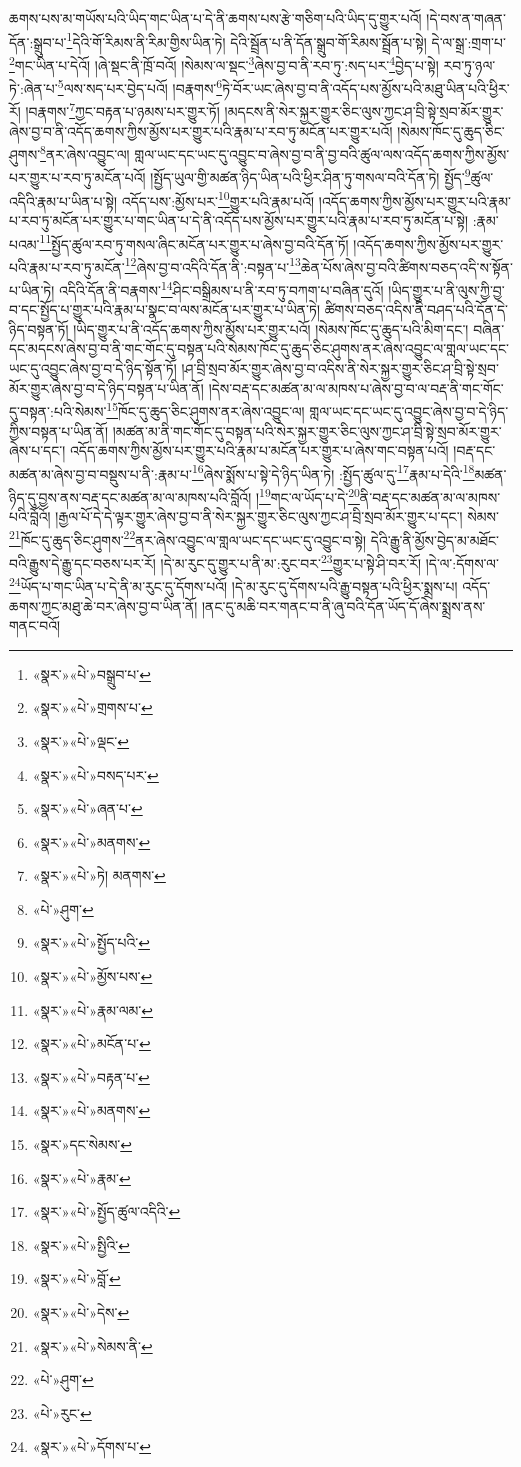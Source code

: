ཆགས་པས་མ་གཡོས་པའི་ཡིད་གང་ཡིན་པ་དེ་ནི་ཆགས་པས་རྩེ་གཅིག་པའི་ཡིད་དུ་གྱུར་པའོ། །དེ་བས་ན་གཞན་དོན་:སྒྲུབ་པ་\footnote{«སྣར་»«པེ་»བསྒྲུབ་པ་}དེའི་གོ་རིམས་ནི་རིམ་གྱིས་ཡིན་ཏེ། དེའི་སྦྲོན་པ་ནི་དོན་སྒྲུབ་གོ་རིམས་སྦྲོན་པ་སྟེ། དེ་ལ་སྒྲ་:གྲག་པ་\footnote{«སྣར་»«པེ་»གྲགས་པ་}གང་ཡིན་པ་དེའོ། །ཞེ་སྡང་ནི་ཁྲོ་བའོ། །སེམས་ལ་སྡང་\footnote{«སྣར་»«པེ་»ལྡང་}ཞེས་བྱ་བ་ནི་རབ་ཏུ་:སད་པར་\footnote{«སྣར་»«པེ་»བསད་པར་}བྱེད་པ་སྟེ། རབ་ཏུ་ཉལ་ཏེ་:ཞེན་པ་\footnote{«སྣར་»«པེ་»ཞན་པ་}ལས་སད་པར་བྱེད་པའོ། །བརྣགས་\footnote{«སྣར་»«པེ་»མནགས་}ཏེ་བོར་ཡང་ཞེས་བྱ་བ་ནི་འདོད་པས་མྱོས་པའི་མཐུ་ཡིན་པའི་ཕྱིར་རོ། །བརྣགས་\footnote{«སྣར་»«པེ་»ཏེ། མནགས་}ཀྱང་བརྟན་པ་ཉམས་པར་གྱུར་ཏོ། །མདངས་ནི་སེར་སྐྱར་གྱུར་ཅིང་ལུས་ཀྱང་ཤ་བྲི་སྟེ་སྲབ་མོར་གྱུར་ཞེས་བྱ་བ་ནི་འདོད་ཆགས་ཀྱིས་མྱོས་པར་གྱུར་པའི་རྣམ་པ་རབ་ཏུ་མངོན་པར་གྱུར་པའོ། །སེམས་ཁོང་དུ་ཆུད་ཅིང་ཤུགས་\footnote{«པེ་»ཤུག་}ནར་ཞེས་འབྱུང་ལ། གླལ་ཡང་དང་ཡང་དུ་འབྱུང་བ་ཞེས་བྱ་བ་ནི་བྱ་བའི་ཚུལ་ལས་འདོད་ཆགས་ཀྱིས་མྱོས་པར་གྱུར་པ་རབ་ཏུ་མངོན་པའོ། །སྤྱོད་ཡུལ་གྱི་མཚན་ཉིད་ཡིན་པའི་ཕྱིར་ཤིན་ཏུ་གསལ་བའི་དོན་ཏེ། སྤྱོད་\footnote{«སྣར་»«པེ་»སྤྱོད་པའི་}ཚུལ་འདིའི་རྣམ་པ་ཡིན་པ་སྟེ། འདོད་པས་:མྱོས་པར་\footnote{«སྣར་»«པེ་»མྱོས་པས་}གྱུར་པའི་རྣམ་པའོ། །འདོད་ཆགས་ཀྱིས་མྱོས་པར་གྱུར་པའི་རྣམ་པ་རབ་ཏུ་མངོན་པར་གྱུར་པ་གང་ཡིན་པ་དེ་ནི་འདོད་པས་མྱོས་པར་གྱུར་པའི་རྣམ་པ་རབ་ཏུ་མངོན་པ་སྟེ། :རྣམ་པའམ་\footnote{«སྣར་»«པེ་»རྣམ་ལམ་}སྤྱོད་ཚུལ་རབ་ཏུ་གསལ་ཞིང་མངོན་པར་གྱུར་པ་ཞེས་བྱ་བའི་དོན་ཏོ། །འདོད་ཆགས་ཀྱིས་མྱོས་པར་གྱུར་པའི་རྣམ་པ་རབ་ཏུ་མངོན་\footnote{«སྣར་»«པེ་»མངོན་པ་}ཞེས་བྱ་བ་འདིའི་དོན་ནི་:བསྟན་པ་\footnote{«སྣར་»«པེ་»བརྟན་པ་}ཆེན་པོས་ཞེས་བྱ་བའི་ཚིགས་བཅད་འདི་ས་སྟོན་པ་ཡིན་ཏེ། འདིའི་དོན་ནི་བརྣགས་\footnote{«སྣར་»«པེ་»མནགས་}ཤིང་བསྒྲིམས་པ་ནི་རབ་ཏུ་བཀག་པ་བཞིན་དུའོ། །ཡིད་གྱུར་པ་ནི་ལུས་ཀྱི་བྱ་བ་དང་སྤྱོད་པ་གྱུར་པའི་རྣམ་པ་སྣང་བ་ལས་མངོན་པར་གྱུར་པ་ཡིན་ཏེ། ཚིགས་བཅད་འདིས་ནི་བཤད་པའི་དོན་དེ་ཉིད་བསྟན་ཏོ། །ཡིད་གྱུར་པ་ནི་འདོད་ཆགས་ཀྱིས་མྱོས་པར་གྱུར་པའོ། །སེམས་ཁོང་དུ་ཆུད་པའི་མིག་དང་། བཞིན་དང་མདངས་ཞེས་བྱ་བ་ནི་གང་གོང་དུ་བསྟན་པའི་སེམས་ཁོང་དུ་ཆུད་ཅིང་ཤུགས་ནར་ཞེས་འབྱུང་ལ་གླལ་ཡང་དང་ཡང་དུ་འབྱུང་ཞེས་བྱ་བ་དེ་ཉིད་སྟོན་ཏོ། །ཤ་བྲི་སྲབ་མོར་གྱུར་ཞེས་བྱ་བ་འདིས་ནི་སེར་སྐྱར་གྱུར་ཅིང་ཤ་བྲི་སྟེ་སྲབ་མོར་གྱུར་ཞེས་བྱ་བ་དེ་ཉིད་བསྟན་པ་ཡིན་ནོ། །དེས་བརྡ་དང་མཚན་མ་ལ་མཁས་པ་ཞེས་བྱ་བ་ལ་བརྡ་ནི་གང་གོང་དུ་བསྟན་:པའི་སེམས་\footnote{«སྣར་»དང་སེམས་}ཁོང་དུ་ཆུད་ཅིང་ཤུགས་ནར་ཞེས་འབྱུང་ལ། གླལ་ཡང་དང་ཡང་དུ་འབྱུང་ཞེས་བྱ་བ་དེ་ཉིད་ཀྱིས་བསྟན་པ་ཡིན་ནོ། །མཚན་མ་ནི་གང་གོང་དུ་བསྟན་པའི་སེར་སྐྱར་གྱུར་ཅིང་ལུས་ཀྱང་ཤ་བྲི་སྟེ་སྲབ་མོར་གྱུར་ཞེས་པ་དང་། འདོད་ཆགས་ཀྱིས་མྱོས་པར་གྱུར་པའི་རྣམ་པ་མངོན་པར་གྱུར་པ་ཞེས་གང་བསྟན་པའོ། །བརྡ་དང་མཚན་མ་ཞེས་བྱ་བ་བསྡུས་པ་ནི་:རྣམ་པ་\footnote{«སྣར་»«པེ་»རྣམ་}ཞེས་སྨོས་པ་སྟེ་དེ་ཉིད་ཡིན་ཏེ། :སྤྱོད་ཚུལ་དུ་\footnote{«སྣར་»«པེ་»སྤྱོད་ཚུལ་འདིའི་}རྣམ་པ་དེའི་\footnote{«སྣར་»«པེ་»སྤྱིའི་}མཚན་ཉིད་དུ་བྱས་ནས་བརྡ་དང་མཚན་མ་ལ་མཁས་པའི་བློའོ། །\footnote{«སྣར་»«པེ་»བློ་}གང་ལ་ཡོད་པ་དེ་\footnote{«སྣར་»«པེ་»དེས་}ནི་བརྡ་དང་མཚན་མ་ལ་མཁས་པའི་བློའོ། །རྒྱལ་པོ་དེ་དེ་ལྟར་གྱུར་ཞེས་བྱ་བ་ནི་སེར་སྐྱར་གྱུར་ཅིང་ལུས་ཀྱང་ཤ་བྲི་སྲབ་མོར་གྱུར་པ་དང་། སེམས་\footnote{«སྣར་»«པེ་»སེམས་ནི་}ཁོང་དུ་ཆུད་ཅིང་ཤུགས་\footnote{«པེ་»ཤུག་}ནར་ཞེས་འབྱུང་ལ་གླལ་ཡང་དང་ཡང་དུ་འབྱུང་བ་སྟེ། དེའི་རྒྱུ་ནི་མྱོས་བྱེད་མ་མཐོང་བའི་རྒྱུས་དེ་རྒྱུ་དང་བཅས་པར་རོ། །དེ་མ་རུང་དུ་གྱུར་པ་ནི་མ་:རུང་བར་\footnote{«པེ་»རུང་}གྱུར་པ་སྟེ་ཤི་བར་རོ། །དེ་ལ་:དོགས་ལ་\footnote{«སྣར་»«པེ་»དོགས་པ་}ཡོད་པ་གང་ཡིན་པ་དེ་ནི་མ་རུང་དུ་དོགས་པའོ། །དེ་མ་རུང་དུ་དོགས་པའི་རྒྱུ་བསྟན་པའི་ཕྱིར་སྨྲས་པ། འདོད་ཆགས་ཀྱང་མཐུ་ཆེ་བར་ཞེས་བྱ་བ་ཡིན་ནོ། །ནང་དུ་མཆི་བར་གནང་བ་ནི་ཞུ་བའི་དོན་ཡོད་དོ་ཞེས་སྨྲས་ནས་གནང་བའོ། 